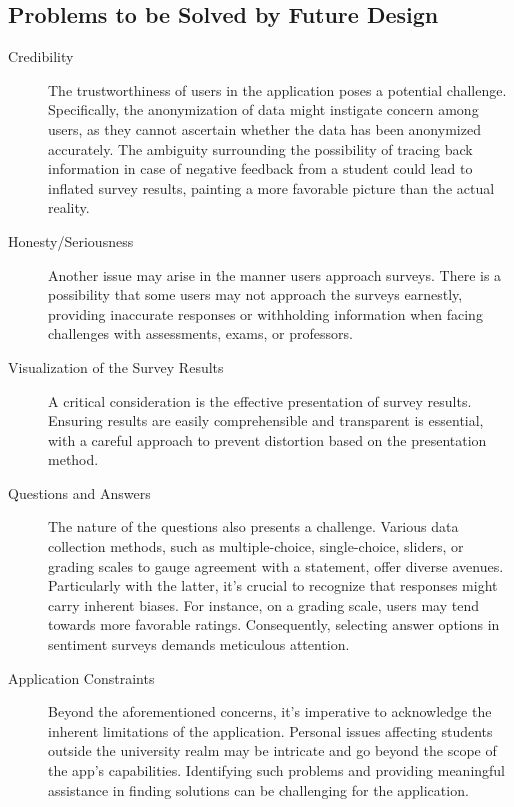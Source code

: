 \documentclass[11pt]{report}
\begin{document}
\subsection{Problems to be Solved by Future Design}

\begin{description}

    \item[Credibility] The trustworthiness of users in the application poses a potential challenge. Specifically, the anonymization of data might instigate concern among users, as they cannot ascertain whether the data has been anonymized accurately. The ambiguity surrounding the possibility of tracing back information in case of negative feedback from a student could lead to inflated survey results, painting a more favorable picture than the actual reality.
    
    \item[Honesty/Seriousness] Another issue may arise in the manner users approach surveys. There is a possibility that some users may not approach the surveys earnestly, providing inaccurate responses or withholding information when facing challenges with assessments, exams, or professors.
    
    \item[Visualization of the Survey Results] A critical consideration is the effective presentation of survey results. Ensuring results are easily comprehensible and transparent is essential, with a careful approach to prevent distortion based on the presentation method. 
    
    \item[Questions and Answers] The nature of the questions also presents a challenge. Various data collection methods, such as multiple-choice, single-choice, sliders, or grading scales to gauge agreement with a statement, offer diverse avenues. Particularly with the latter, it's crucial to recognize that responses might carry inherent biases. For instance, on a grading scale, users may tend towards more favorable ratings. Consequently, selecting answer options in sentiment surveys demands meticulous attention. 
    
    \item[Application Constraints] Beyond the aforementioned concerns, it's imperative to acknowledge the inherent limitations of the application. Personal issues affecting students outside the university realm may be intricate and go beyond the scope of the app's capabilities. Identifying such problems and providing meaningful assistance in finding solutions can be challenging for the application.
    
\end{description}
\end{document}
